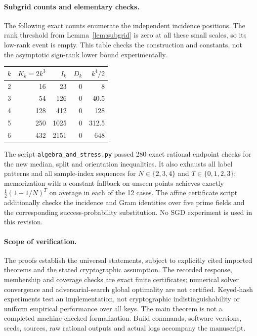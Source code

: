 \paragraph{Subgrid counts and elementary checks.}
The following exact counts enumerate the independent incidence positions. The rank threshold from Lemma~\ref{lem:subgrid} is zero at all these small scales, so its low-rank event is empty. This table checks the construction and constants, not the asymptotic sign-rank lower bound experimentally.
\begin{center}
\begin{tabular}{rrrrr}
\toprule
$k$&$K_k=2k^3$&$I_k$&$D_k$&$k^4/2$\\
\midrule
2&16&23&0&8\\
3&54&126&0&40.5\\
4&128&412&0&128\\
5&250&1025&0&312.5\\
6&432&2151&0&648\\
\bottomrule
\end{tabular}
\end{center}
The script \texttt{algebra\_and\_stress.py} passed 280 exact rational endpoint checks for the new median, split and orientation inequalities. It also exhausts all label patterns and all sample-index sequences for $N\in\{2,3,4\}$ and $T\in\{0,1,2,3\}$: memorization with a constant fallback on unseen points achieves exactly $\tfrac12(1-1/N)^T$ on average in each of the 12 cases. The affine certificate script additionally checks the incidence and Gram identities over five prime fields and the corresponding success-probability substitution. No SGD experiment is used in this revision.

\paragraph{Scope of verification.}
The proofs establish the universal statements, subject to explicitly cited imported theorems and the stated cryptographic assumption. The recorded response, membership and coverage checks are exact finite certificates; numerical solver convergence and adversarial-search global optimality are not certified. Keyed-hash experiments test an implementation, not cryptographic indistinguishability or uniform empirical performance over all keys. The main theorem is not a completed machine-checked formalization. Build commands, software versions, seeds, sources, raw rational outputs and actual logs accompany the manuscript.
